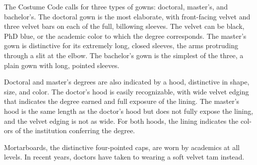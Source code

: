 \documentclass{tufte-handout}
\begin{document}
The Costume Code calls for three types of gowns: doctoral, master’s, and bachelor’s. The doc­toral gown is the most elaborate, with front-facing velvet and three velvet bars on each of the full, bil­lowing sleeves. The velvet can be black, PhD blue, or the academic color to which the degree corre­sponds. The master’s gown is distinctive for its ex­tremely long, closed sleeves, the arms protruding through a slit at the elbow. The bachelor’s gown is the simplest of the three, a plain gown with long, pointed sleeves.

Doctoral and master’s degrees are also indicat­ed by a hood, distinctive in shape, size, and color. The doctor’s hood is easily recognizable, with wide velvet edging that indicates the degree earned and full exposure of the lining. The master’s hood is the same length as the doctor’s hood but does not fully expose the lining, and the velvet edging is not as wide. For both hoods, the lining indicates the col­ors of the institution conferring the degree.

Mortarboards, the distinctive four-pointed caps, are worn by academics at all levels. In recent years, doctors have taken to wearing a soft velvet tam instead.
\end{document}
